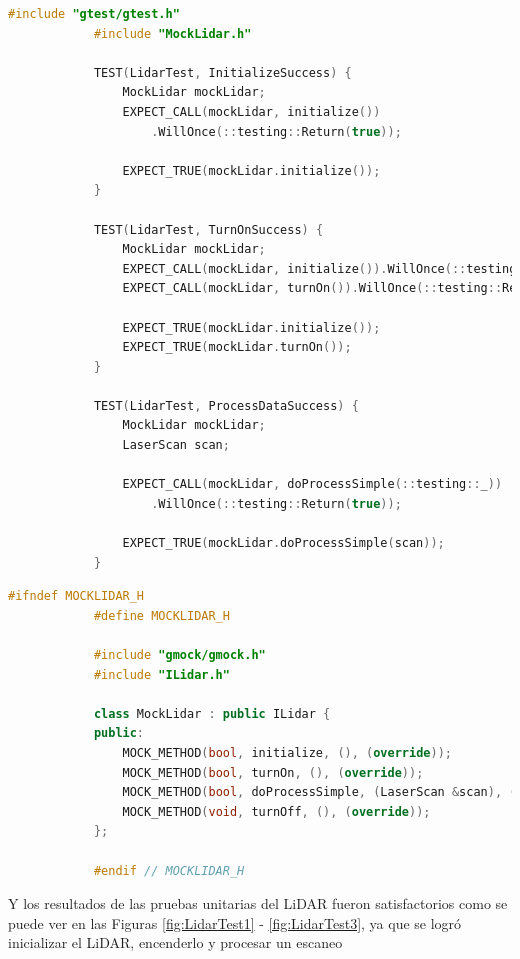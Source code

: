         \begin{lstlisting}[language={C++}, caption={LidarTest.cpp}, label={LidarTest.cpp}]
            #include "gtest/gtest.h"
            #include "MockLidar.h"

            TEST(LidarTest, InitializeSuccess) {
                MockLidar mockLidar;
                EXPECT_CALL(mockLidar, initialize())
                    .WillOnce(::testing::Return(true));

                EXPECT_TRUE(mockLidar.initialize());
            }

            TEST(LidarTest, TurnOnSuccess) {
                MockLidar mockLidar;
                EXPECT_CALL(mockLidar, initialize()).WillOnce(::testing::Return(true));
                EXPECT_CALL(mockLidar, turnOn()).WillOnce(::testing::Return(true));

                EXPECT_TRUE(mockLidar.initialize());
                EXPECT_TRUE(mockLidar.turnOn());
            }

            TEST(LidarTest, ProcessDataSuccess) {
                MockLidar mockLidar;
                LaserScan scan;

                EXPECT_CALL(mockLidar, doProcessSimple(::testing::_))
                    .WillOnce(::testing::Return(true));

                EXPECT_TRUE(mockLidar.doProcessSimple(scan));
            }

        \end{lstlisting}
        \begin{lstlisting}[language={C++}, caption={MockLidar.h}, label={MockLidar.h}]
            #ifndef MOCKLIDAR_H
            #define MOCKLIDAR_H

            #include "gmock/gmock.h"
            #include "ILidar.h"

            class MockLidar : public ILidar {
            public:
                MOCK_METHOD(bool, initialize, (), (override));
                MOCK_METHOD(bool, turnOn, (), (override));
                MOCK_METHOD(bool, doProcessSimple, (LaserScan &scan), (override));
                MOCK_METHOD(void, turnOff, (), (override));
            };

            #endif // MOCKLIDAR_H

        \end{lstlisting}
    \vskip 0.5cm
    Y los resultados de las pruebas unitarias del LiDAR fueron satisfactorios como se 
    puede ver en las Figuras \ref{fig:LidarTest1} - \ref{fig:LidarTest3}, ya que se logr\'o inicializar el LiDAR, encenderlo y procesar un escaneo
